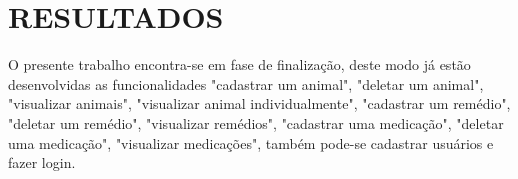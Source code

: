 %
%


\chapter{\textbf{RESULTADOS}}\label{chap:resultados}

O presente trabalho encontra-se em fase de finalização, deste modo já estão desenvolvidas as funcionalidades "cadastrar um animal", "deletar um animal", "visualizar animais", "visualizar animal individualmente", "cadastrar um remédio", "deletar um remédio", "visualizar remédios", "cadastrar uma medicação", "deletar uma medicação", "visualizar medicações", também pode-se cadastrar usuários e fazer login.  
